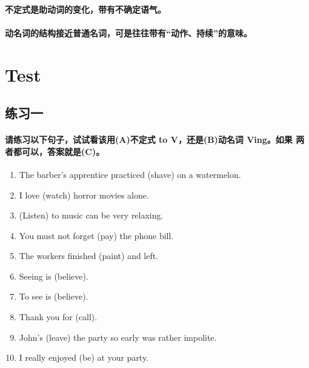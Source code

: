 \paragraph{不定式是助动词的变化，带有不确定语气。}
\paragraph{动名词的结构接近普通名词，可是往往带有“动作、持续”的意味。}

\section{Test}

\subsection{练习一}

\paragraph{请练习以下句子，试试看该用(A)不定式 to V，还是(B)动名词 Ving。如果
  两者都可以，答案就是(C)。}

\begin{enumerate}
\item The barber's apprentice practiced \ttu (shave) on a watermelon.

\item I love \ttu (watch) horror movies alone.

\item \ttu (Listen) to music can be very relaxing.

\item You must not forget \ttu (pay) the phone bill.

\item The workers finished \ttu (paint) and left.

\item Seeing is \ttu (believe).

\item To see is \ttu (believe).

\item Thank you for \ttu (call).

\item John's \ttu (leave) the party so early was rather impolite.

\item I really enjoyed \ttu (be) at your party.
\end{enumerate}


